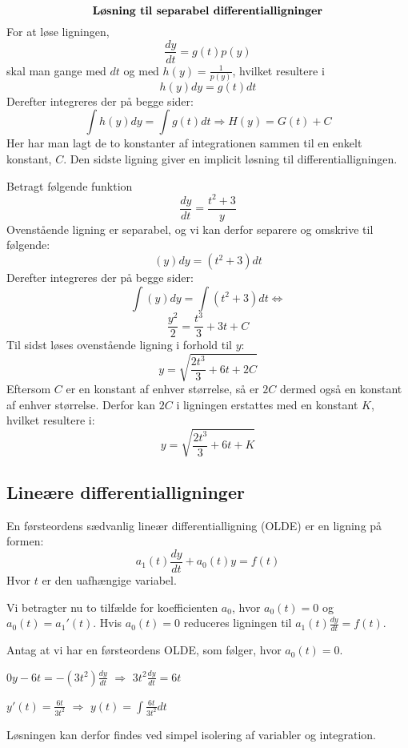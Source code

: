 \begin{tcolorbox}
\begin{equation}\label{LSD}
\textbf{Løsning til separabel differentialligninger}\\
\end{equation}
\hfill \break
For at løse ligningen, $$\frac{dy}{dt} = g(t)p(y)$$ skal man gange med $dt$ og med $h(y)=\frac{1}{p(y)}$, hvilket resultere i $$h(y)dy=g(t)dt$$ Derefter integreres der på begge sider: $$\int h(y)dy= \int g(t)dt \Longrightarrow H(y)=G(t)+C$$ Her har man lagt de to konstanter af integrationen sammen til en enkelt konstant, $C$. Den sidste ligning giver en implicit løsning til differentialligningen.
\end{tcolorbox}

\begin{Example}\hfill \break
\textnormal{Betragt følgende funktion} $$\frac{dy}{dt}=\frac{t^2+3}{y}$$ \textnormal{Ovenstående ligning er separabel, og vi kan derfor separere og omskrive til følgende:} $$(y)dy=(t^2+3)dt$$ \textnormal{Derefter integreres der på begge sider:} $$\int (y)dy=\int (t^2+3)dt\Leftrightarrow$$ $$\frac{y^2}{2}=\frac{t^3}{3}+3t+C$$ \textnormal{Til sidst løses ovenstående ligning i forhold til} $y$:$$y=\sqrt{\frac{2t^3}{3}+6t+2C}$$ \textnormal{Eftersom $C$ er en konstant af enhver størrelse, så er $2C$ dermed også en konstant af enhver størrelse. Derfor kan $2C$ i ligningen erstattes med en konstant $K$, hvilket resultere i:} $$y=\sqrt{\frac{2t^3}{3}+6t+K}$$
\end{Example}

\subsection{Lineære differentialligninger}

En førsteordens sædvanlig lineær differentialligning (OLDE) er en ligning på formen: \\ 
$$a_{1}(t) \frac{dy}{dt} + a_{0}(t)y = f(t)$$ Hvor $t$ er den uafhængige variabel. \hfill \break

Vi betragter nu to tilfælde for koefficienten $a_0$, hvor $a_0(t) = 0$ og $a_0(t) = a_1'(t)$. Hvis $a_0(t) = 0$ reduceres ligningen til $a_1(t)\frac{dy}{dt} = f(t)$.  
\begin{Example}\hfill \break
\textnormal{Antag at vi har en førsteordens OLDE, som følger, hvor $a_0(t) = 0$.}\\
\hfill \break
\centerline{$0y - 6t = -(3t^2) \frac{dy}{dt}$ $\Rightarrow$ $3t^2 \frac{dy}{dt} = 6t$}
\hfill \break
\centerline{$y'(t) = \frac{6t}{3t^2}$ $\Rightarrow$ $y(t) = \int \frac{6t}{3t^2}dt$}
\hfill \break
\textnormal{Løsningen kan derfor findes ved simpel isolering af variabler og integration.}
\end{Example}

